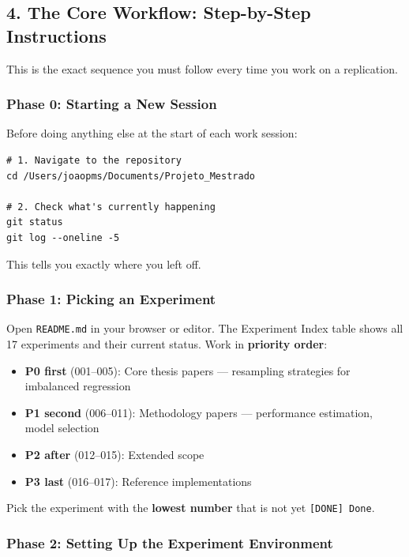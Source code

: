 \subsection{4. The Core Workflow: Step-by-Step
Instructions}\label{the-core-workflow-step-by-step-instructions}

This is the exact sequence you must follow every time you work on a
replication.

\subsubsection{Phase 0: Starting a New
Session}\label{phase-0-starting-a-new-session}

Before doing anything else at the start of each work session:

\begin{verbatim}
# 1. Navigate to the repository
cd /Users/joaopms/Documents/Projeto_Mestrado

# 2. Check what's currently happening
git status
git log --oneline -5
\end{verbatim}

This tells you exactly where you left off.

\subsubsection{Phase 1: Picking an
Experiment}\label{phase-1-picking-an-experiment}

Open \texttt{README.md} in your browser or editor. The
Experiment Index table shows all 17 experiments and their current
status. Work in \textbf{priority order}:

\begin{itemize}
\tightlist
\item
  \textbf{P0 first} (001--005): Core thesis papers --- resampling
  strategies for imbalanced regression
\item
  \textbf{P1 second} (006--011): Methodology papers --- performance
  estimation, model selection
\item
  \textbf{P2 after} (012--015): Extended scope
\item
  \textbf{P3 last} (016--017): Reference implementations
\end{itemize}

Pick the experiment with the \textbf{lowest number} that is not yet
\texttt{[DONE] Done}.

\subsubsection{Phase 2: Setting Up the Experiment
Environment}\label{phase-2-setting-up-the-experiment-environment}

